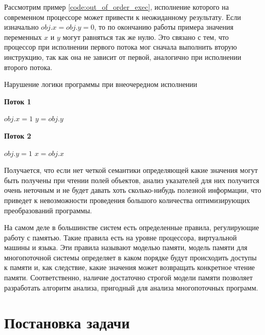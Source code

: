 \documentclass[14pt,titlepage]{extarticle}
\newcommand{\algorithmictitle}[1]{\hspace{8mm}\textbf{#1}}
\let\oldsection\section
\renewcommand{\section}{\newpage\oldsection}
\begin{document}
      Рассмотрим пример \ref{code:out_of_order_exec}, исполнение которого на
      современном процессоре может привести к неожиданному результату.
      Если изначально $obj.x = obj.y = 0$, то по окончанию работы примера
      значения переменных $x$ и $y$ могут равняться так же нулю. Это связано с
      тем, что процессор при исполнении первого потока мог сначала выполнить
      вторую инструкцию, так как она не зависит от первой, аналогично при
      исполнении второго потока.

      \begin{algorithm}
        \caption{Нарушение логики программы при внеочередном исполнении}
        \label{code:out_of_order_exec}
        \begin{multicols*}{2}
          \algorithmictitle{Поток 1}
          \begin{algorithmic}[1]
            \STATE $obj.x = 1$
            \STATE $y = obj.y$
          \end{algorithmic}
          \columnbreak
          \algorithmictitle{Поток 2}
          \begin{algorithmic}[1]
            \STATE $obj.y = 1$
            \STATE $x = obj.x$
          \end{algorithmic}
        \end{multicols*}
      \end{algorithm}

      Получается, что если нет четкой семантики определяющей какие значения
      могут быть получены при чтении полей объектов, анализ указателей для
      них получится очень неточным и не будет давать хоть сколько-нибудь
      полезной информации, что приведет к невозможности проведения большого
      количества оптимизирующих преобразований программы.

      На самом деле в большинстве систем есть определенные правила,
      регулирующие работу с памятью. Такие правила есть на уровне процессора,
      виртуальной машины и языка. Эти правила называют моделью памяти,
      модель памяти для многопоточной системы определяет в каком
      порядке будут происходить доступы к памяти и, как следствие, какие
      значения может возвращать конкретное чтение памяти. Соответственно,
      наличие достаточно строгой модели памяти позволяет разработать алгоритм
      анализа, пригодный для анализа многопоточных программ.


  \section{Постановка задачи}
\end{document}

